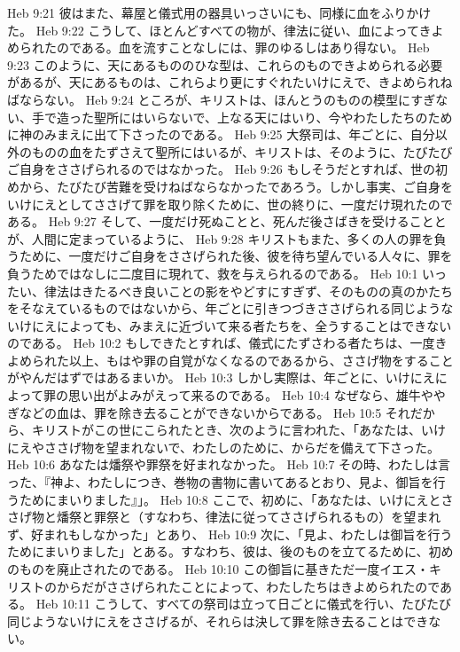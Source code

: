 Heb 9:21  彼はまた、幕屋と儀式用の器具いっさいにも、同様に血をふりかけた。
Heb 9:22  こうして、ほとんどすべての物が、律法に従い、血によってきよめられたのである。血を流すことなしには、罪のゆるしはあり得ない。
Heb 9:23  このように、天にあるもののひな型は、これらのものできよめられる必要があるが、天にあるものは、これらより更にすぐれたいけにえで、きよめられねばならない。
Heb 9:24  ところが、キリストは、ほんとうのものの模型にすぎない、手で造った聖所にはいらないで、上なる天にはいり、今やわたしたちのために神のみまえに出て下さったのである。
Heb 9:25  大祭司は、年ごとに、自分以外のものの血をたずさえて聖所にはいるが、キリストは、そのように、たびたびご自身をささげられるのではなかった。
Heb 9:26  もしそうだとすれば、世の初めから、たびたび苦難を受けねばならなかったであろう。しかし事実、ご自身をいけにえとしてささげて罪を取り除くために、世の終りに、一度だけ現れたのである。
Heb 9:27  そして、一度だけ死ぬことと、死んだ後さばきを受けることとが、人間に定まっているように、
Heb 9:28  キリストもまた、多くの人の罪を負うために、一度だけご自身をささげられた後、彼を待ち望んでいる人々に、罪を負うためではなしに二度目に現れて、救を与えられるのである。
Heb 10:1  いったい、律法はきたるべき良いことの影をやどすにすぎず、そのものの真のかたちをそなえているものではないから、年ごとに引きつづきささげられる同じようないけにえによっても、みまえに近づいて来る者たちを、全うすることはできないのである。
Heb 10:2  もしできたとすれば、儀式にたずさわる者たちは、一度きよめられた以上、もはや罪の自覚がなくなるのであるから、ささげ物をすることがやんだはずではあるまいか。
Heb 10:3  しかし実際は、年ごとに、いけにえによって罪の思い出がよみがえって来るのである。
Heb 10:4  なぜなら、雄牛ややぎなどの血は、罪を除き去ることができないからである。
Heb 10:5  それだから、キリストがこの世にこられたとき、次のように言われた、「あなたは、いけにえやささげ物を望まれないで、わたしのために、からだを備えて下さった。
Heb 10:6  あなたは燔祭や罪祭を好まれなかった。
Heb 10:7  その時、わたしは言った、『神よ、わたしにつき、巻物の書物に書いてあるとおり、見よ、御旨を行うためにまいりました』」。
Heb 10:8  ここで、初めに、「あなたは、いけにえとささげ物と燔祭と罪祭と（すなわち、律法に従ってささげられるもの）を望まれず、好まれもしなかった」とあり、
Heb 10:9  次に、「見よ、わたしは御旨を行うためにまいりました」とある。すなわち、彼は、後のものを立てるために、初めのものを廃止されたのである。
Heb 10:10  この御旨に基きただ一度イエス・キリストのからだがささげられたことによって、わたしたちはきよめられたのである。
Heb 10:11  こうして、すべての祭司は立って日ごとに儀式を行い、たびたび同じようないけにえをささげるが、それらは決して罪を除き去ることはできない。
